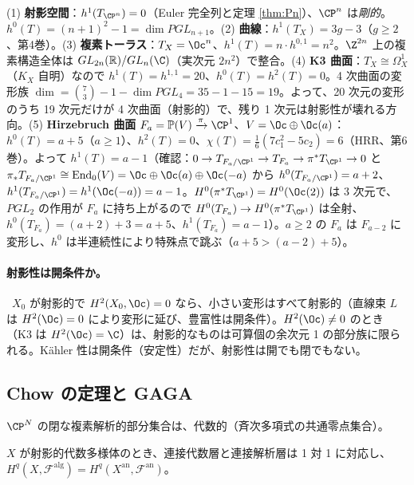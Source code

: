\begin{ex}[変形の次元]\label{ex:def}
(1) \textbf{射影空間}：$h^1(T_{\CP^n})=0$（Euler 完全列と定理 \ref{thm:Pn}）、$\CP^n$ は\emph{剛的}。$h^0(T)=(n+1)^2-1=\dim PGL_{n+1}$。(2) \textbf{曲線}：$h^1(T_X)=3g-3$（$g\ge2$、第4巻）。(3) \textbf{複素トーラス}：$T_X=\Oc^n$、$h^1(T)=n\cdot h^{0,1}=n^2$。$\Z^{2n}$ 上の複素構造全体は $GL_{2n}(\mathbb R)/GL_n(\C)$（実次元 $2n^2$）で整合。(4) \textbf{K3 曲面}：$T_X\cong\Omega^1_X$（$K_X$ 自明）なので $h^1(T)=h^{1,1}=20$、$h^0(T)=h^2(T)=0$。4 次曲面の変形族 $\dim=\binom73-1-\dim PGL_4=35-1-15=19$。よって、20 次元の変形のうち 19 次元だけが 4 次曲面（射影的）で、残り 1 次元は射影性が壊れる方向。(5) \textbf{Hirzebruch 曲面} $F_a=\mathbb P(V)\xrightarrow{\pi}\CP^1$、$V=\Oc\oplus\Oc(a)$：$h^0(T)=a+5$（$a\ge1$）、$h^2(T)=0$、$\chi(T)=\frac16(7c_1^2-5c_2)=6$（HRR、第6巻）。よって $h^1(T)=a-1$（確認：$0\to T_{F_a/\CP^1}\to T_{F_a}\to\pi^*T_{\CP^1}\to0$ と $\pi_*T_{F_a/\CP^1}\cong\mathrm{End}_0(V)=\Oc\oplus\Oc(a)\oplus\Oc(-a)$ から $h^0(T_{F_a/\CP^1})=a+2$、$h^1(T_{F_a/\CP^1})=h^1(\Oc(-a))=a-1$。$H^0(\pi^*T_{\CP^1})=H^0(\Oc(2))$ は 3 次元で、$PGL_2$ の作用が $F_a$ に持ち上がるので $H^0(T_{F_a})\to H^0(\pi^*T_{\CP^1})$ は全射、$h^0(T_{F_a})=(a+2)+3=a+5$、$h^1(T_{F_a})=a-1$）。$a\ge2$ の $F_a$ は $F_{a-2}$ に変形し、$h^0$ は半連続性により特殊点で跳ぶ（$a+5>(a-2)+5$）\tC。
\end{ex}
\paragraph{射影性は開条件か。}\tC\ $X_0$ が射影的で $H^2(X_0,\Oc)=0$ なら、小さい変形はすべて射影的（直線束 $L$ は $H^2(\Oc)=0$ により変形に延び、豊富性は開条件）。$H^2(\Oc)\ne0$ のとき（K3 は $H^2(\Oc)=\C$）は、射影的なものは可算個の余次元 1 の部分族に限られる。Kähler 性は開条件（安定性）だが、射影性は開でも閉でもない。

\subsection{Chow の定理と GAGA}
\begin{thm}[Chow]\label{thm:chow}\tC
$\CP^N$ の閉な複素解析的部分集合は、代数的（斉次多項式の共通零点集合）。
\end{thm}
\begin{thm}\tC
$X$ が射影的代数多様体のとき、連接代数層と連接解析層は 1 対 1 に対応し、$H^q(X,\mathcal F^{\mathrm{alg}})=H^q(X^{\mathrm{an}},\mathcal F^{\mathrm{an}})$。
\end{thm}
